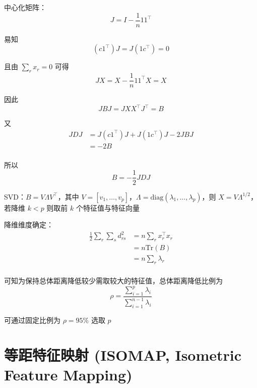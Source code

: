 \documentclass[openany]{ctexbook}
\theoremstyle{kaiti}
\theoremstyle{normal}
\begin{document}
中心化矩阵：
\begin{equation}
J=I-\frac{1}{n}11^{\top}
\end{equation}

易知
\begin{equation}
\left(c1^{\top} \right)J=J\left(1c^{\top} \right)=0
\end{equation}

且由 $\sum_rx_r=0$ 可得
\begin{equation}
JX=X-\frac{1}{n}11^{\top}X=X
\end{equation}

因此
\begin{equation}
JBJ=JXX^{\top}J^{\top}=B
\end{equation}

又
\begin{equation}
\begin{aligned}
  JDJ&=J\left(c1^{\top} \right)J+J\left(1c^{\top} \right)J-2JBJ\\
  &=-2B \\
\end{aligned}
\end{equation}

所以
\begin{equation}
B=-\frac{1}{2}JDJ
\end{equation}

SVD：$B=V\Lambda V^{\top}$，其中 $V=\left[v_1,\dots ,v_p \right]$，$\Lambda =\mathrm{diag}\left(\lambda_1,\dots ,\lambda_p \right)$，则 $X=V\Lambda ^{1/2}$，若降维 $k < p$ 则取前 $k$ 个特征值与特征向量

降维维度确定：
\begin{equation}
\begin{aligned}
  \frac{1}{2}\sum_r\sum_sd_{rs}^{2}
  &=n\sum_rx_{r}^{\top}x_r\\
  &=n\mathrm{Tr}\left(B \right)\\
  &=n\sum_r\lambda_r\\
\end{aligned}
\end{equation}

可知为保持总体距离降低较少需取较大的特征值，总体距离降低比例为 
\begin{equation}
\rho=\frac{\displaystyle\sum_{i=1}^{p}\lambda_i}{\displaystyle\sum_{i=1}^{n-1}\lambda_i}
\end{equation}

可通过固定比例为 $\rho=95\%$ 选取 $p$

\section{等距特征映射 (ISOMAP, Isometric Feature Mapping) }
\end{document}
